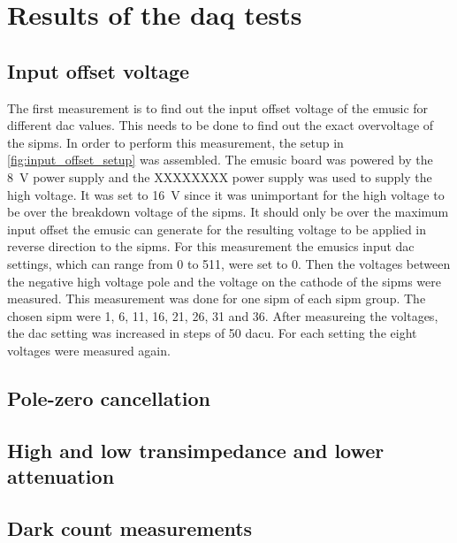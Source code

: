 \chapter{Results of the \ac{daq} tests}


\section{Input offset voltage}
The first measurement is to find out the input offset voltage of the \ac{emusic} for different \ac{dac} values.
This needs to be done to find out the exact overvoltage of the \acp{sipm}.
In order to perform this measurement, the setup in \autoref{fig:input_offset_setup} was assembled.
The \ac{emusic} board was powered by the \SI{8}{\volt} power supply and the XXXXXXXX power supply was used to supply the high voltage.
It was set to \SI{16}{\volt} since it was unimportant for the high voltage to be over the breakdown voltage of the \acp{sipm}.
It should only be over the maximum input offset the \ac{emusic} can generate for the resulting voltage to be applied in reverse direction to the \acp{sipm}.
For this measurement the \ac{emusic}s input \ac{dac} settings, which can range from 0 to 511, were set to 0.
Then the voltages between the negative high voltage pole and the voltage on the cathode of the \acp{sipm} were measured.
This measurement was done for one \ac{sipm} of each \ac{sipm} group.
The chosen \ac{sipm} were 1, 6, 11, 16, 21, 26, 31 and 36.
After measureing the voltages, the \ac{dac} setting was increased in steps of 50 \ac{dac}u.
For each setting the eight voltages were measured again.


\section{Pole-zero cancellation}
\section{High and low transimpedance and lower attenuation}
\section{Dark count measurements}

